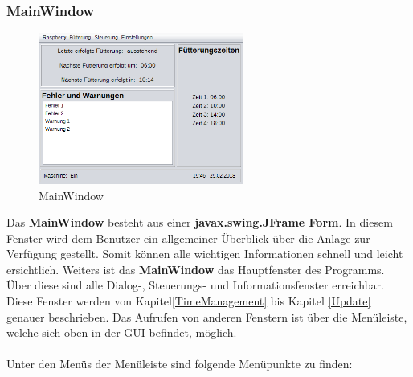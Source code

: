 \subsubsection{MainWindow}\label{subsubsec:MainWindow}
\begin{figure}
\vspace{-20pt}
  \begin{center}
    \includegraphics[width=0.60\textwidth]{Bilder/GUI/MainWindow}
  \end{center}
  \caption{MainWindow}
  \label{MainWindow}
  \vspace{20pt}
\end{figure}
Das \textbf{MainWindow} besteht aus einer \textbf{javax.swing.JFrame Form}. In diesem Fenster wird dem Benutzer ein allgemeiner Überblick über die Anlage zur Verfügung gestellt. Somit können alle wichtigen Informationen schnell und leicht ersichtlich. Weiters ist das \textbf{MainWindow} das Hauptfenster des Programms. Über diese sind alle Dialog-, Steuerungs- und Informationsfenster erreichbar. Diese Fenster werden von Kapitel\ref{TimeManagement} bis Kapitel \ref{Update} genauer beschrieben. Das Aufrufen von anderen Fenstern ist über die Menüleiste, welche sich oben in der GUI befindet, möglich. 
\\ \\ Unter den Menüs der Menüleiste sind folgende Menüpunkte zu finden:
